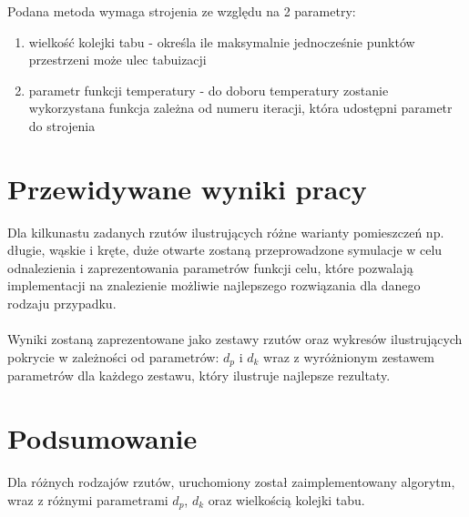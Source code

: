 \documentclass[12pt,a4paper]{article}
\begin{document}
Podana metoda wymaga strojenia ze względu na 2 parametry:
\begin{enumerate}
  \item wielkość kolejki tabu - określa ile maksymalnie jednocześnie punktów przestrzeni może ulec tabuizacji
  \item parametr funkcji temperatury - do doboru temperatury zostanie wykorzystana funkcja zależna od numeru iteracji, która udostępni parametr do strojenia
\end{enumerate}

\section{Przewidywane wyniki pracy}
Dla kilkunastu zadanych rzutów ilustrujących różne warianty pomieszczeń np. długie, wąskie i kręte,
duże otwarte zostaną przeprowadzone symulacje w celu odnalezienia i zaprezentowania
parametrów funkcji celu, które pozwalają implementacji na znalezienie możliwie
najlepszego rozwiązania dla danego rodzaju przypadku. \\ \\
Wyniki zostaną zaprezentowane jako zestawy rzutów oraz wykresów
ilustrujących pokrycie w zależności od parametrów: $d_p$ i $d_k$ wraz z wyróżnionym zestawem
parametrów dla każdego zestawu, który ilustruje najlepsze rezultaty.

\newpage
\section{Podsumowanie}
Dla różnych rodzajów rzutów, uruchomiony został zaimplementowany algorytm, wraz z różnymi parametrami $d_p$, $d_k$ oraz wielkością kolejki tabu.
\end{document}
